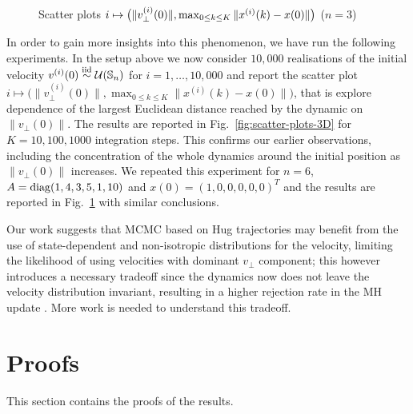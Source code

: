 \documentclass[10pt]{article}
\begin{document}
\begin{figure}
\centering
{}



\caption{Scatter plots $i\protect\mapsto\big(\|v_{\perp}^{(i)}(0)\|,\max_{0\protect\leq k\protect\leq K}\|x^{(i)}(k)-x(0)\|\big)$
($n=3$)}
\label{fig:6D-scatter}
\end{figure}





In order to gain more insights into this phenomenon, we have run the
following experiments. In the setup above we now consider $10,000$
realisations of the initial velocity $v^{(i)}(0)\overset{{\rm iid}}{\sim}\mathcal{U}(\mathbb{S}_{n})$
for $i=1,\ldots,10,000$ and report the scatter plot $i\mapsto\big(\|v_{\perp}^{(i)}(0)\|,\max_{0\leq k\leq K}\|x^{(i)}(k)-x(0)\|\big)$,
that is explore dependence of the largest Euclidean distance reached
by the dynamic on $\|v_{\perp}(0)\|$. The results are reported in
Fig.~\ref{fig:scatter-plots-3D} for $K=10,100,1000$ integration
steps. This confirms our earlier observations, including the concentration
of the whole dynamics around the initial position as $\|v_{\perp}(0)\|$
increases. We repeated this experiment for $n=6$, $A={\rm {\rm diag}}(1,4,3,5,1,10)$
and $x(0)=(1,0,0,0,0,0)^{T}$ and the results are reported in Fig.~\ref{fig:6D-scatter}
with similar conclusions.

Our work suggests that MCMC based on Hug trajectories may benefit
from the use of state-dependent and non-isotropic distributions for
the velocity, limiting the likelihood of using velocities with dominant
$v_{\perp}$ component; this however introduces a necessary tradeoff
since the dynamics now does not leave the velocity distribution invariant,
resulting in a higher rejection rate in the MH update \cite{C24}.
More work is needed to understand this tradeoff.






\section{Proofs}\label{sec:proofs}
This section contains the proofs of the results.
\end{document}
